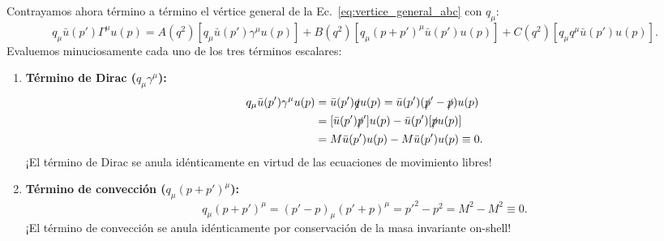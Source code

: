 \documentclass[10pt,a4paper]{article}
\begin{document}
Contrayamos ahora término a término el vértice general de la Ec.~\eqref{eq:vertice_general_abc} con $q_\mu$:
\begin{equation}
q_\mu \bar{u}(p') \Gamma^\mu u(p) = A(q^2) \left[ q_\mu \bar{u}(p') \gamma^\mu u(p) \right] + B(q^2) \left[ q_\mu (p + p')^\mu \bar{u}(p') u(p) \right] + C(q^2) \left[ q_\mu q^\mu \bar{u}(p') u(p) \right].
\end{equation}
Evaluemos minuciosamente cada uno de los tres términos escalares:
\begin{enumerate}
    \item \textbf{Término de Dirac ($q_\mu \gamma^\mu$):}
    \begin{align}
    q_\mu \bar{u}(p') \gamma^\mu u(p) &= \bar{u}(p') \slashed{q} u(p) = \bar{u}(p') (\slashed{p}' - \slashed{p}) u(p) \nonumber \\
    &= [\bar{u}(p') \slashed{p}'] u(p) - \bar{u}(p') [\slashed{p} u(p)] \nonumber \\
    &= M \bar{u}(p') u(p) - M \bar{u}(p') u(p) \equiv 0.
    \end{align}
    ¡El término de Dirac se anula idénticamente en virtud de las ecuaciones de movimiento libres!

    \item \textbf{Término de convección ($q_\mu (p+p')^\mu$):}
    \begin{equation}
    q_\mu (p + p')^\mu = (p' - p)_\mu (p' + p)^\mu = p'^2 - p^2 = M^2 - M^2 \equiv 0.
    \end{equation}
    ¡El término de convección se anula idénticamente por conservación de la masa invariante on-shell!


\end{enumerate}
\end{document}
